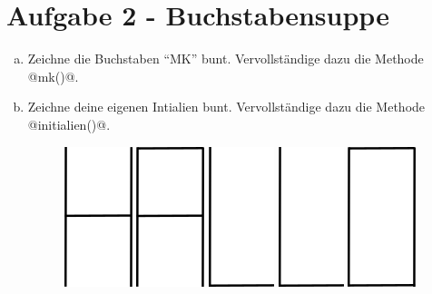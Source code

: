     \section*{Aufgabe 2 - Buchstabensuppe}
    \begin{enumerate}[a)]
        \item
        Zeichne die Buchstaben \enquote{MK} bunt. Vervollständige dazu die Methode @mk()@.
        \item 
        Zeichne deine eigenen Intialien bunt. Vervollständige dazu die Methode @initialien()@.
        \begin{figure}[htbp]
            \centering
            \includegraphics{img/LetterH}
            \includegraphics{img/LetterA}
            \includegraphics{img/LetterL}
            \includegraphics{img/LetterL}
            \includegraphics{img/LetterO}
        \end{figure}
    \end{enumerate}
  
